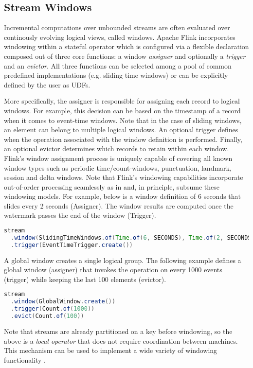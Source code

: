 \subsection{Stream Windows}
Incremental computations over unbounded streams are often evaluated over continously evolving logical views, called windows. Apache Flink incorporates windowing within a stateful operator which is configured via a flexible declaration composed out of three core functions: a window \textit{assigner} and optionally a \textit{trigger} and an \textit{evictor}. All three functions can be selected among a pool of common predefined implementations (e.g. sliding time windows) or can be explicitly defined by the user as UDFs.

More specifically, the assigner is responsible for assigning each record to logical windows. For example, this decision can be based on the timestamp of a record when it comes to event-time windows. Note that in the case of sliding windows, an element can belong to multiple logical windows. An optional trigger defines when the operation associated with the window definition is performed. Finally, an optional evictor determines which records to retain within each window. Flink's window assignment process is uniquely capable of covering all known window types such as periodic time/count-windows, punctuation, landmark, session and delta windows. Note that Flink's windowing capabilities incorporate out-of-order processing seamlessly as in \cite{li2005semantics, akidau2015dataflow} and, in principle, subsume these windowing models. For example, below is a window definition of 6 seconds that slides every 2 seconds (Assigner). The window results are computed once the watermark passes the end of the window (Trigger).

\begin{lstlisting}[language=Java]
stream
  .window(SlidingTimeWindows.of(Time.of(6, SECONDS), Time.of(2, SECONDS))
  .trigger(EventTimeTrigger.create())
\end{lstlisting}

A global window creates a single logical group. The following example defines a global window (assigner) that invokes the operation on every 1000 events (trigger) while keeping the last 100 elements (evictor). 

\begin{lstlisting}[language=Java]
stream
  .window(GlobalWindow.create())
  .trigger(Count.of(1000))
  .evict(Count.of(100))
\end{lstlisting}

Note that streams are already partitioned on a key before windowing, so the above is a \textit{local operator} that does not require coordination between machines. This mechanism can be used to implement a wide variety of windowing functionality \cite{akidau2015dataflow}. 





